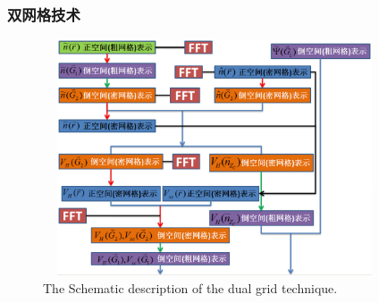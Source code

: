 %
%
%
\frame
{
	\frametitle{双网格技术}
\begin{figure}[h!]
	\vspace{-0.15in}
\centering
\includegraphics[height=2.75in,width=4.0in,viewport=0 0 800 600,clip]{Figures/dual_grid-2.png}
\caption{\tiny \textrm{The Schematic description of the dual grid technique.}}%
\label{PAW_dualgrid}
\end{figure} 
}

